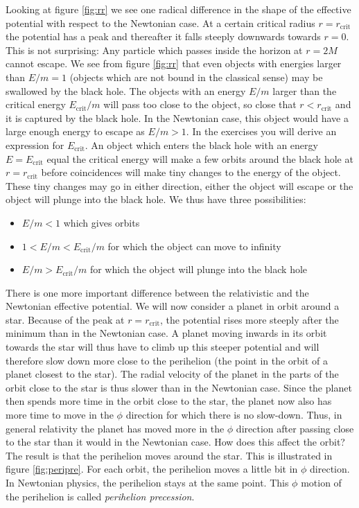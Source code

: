 \begin{multicols}{2}
Looking at figure \ref{fig:rr} we see one radical difference in the shape of the effective potential with respect to the Newtonian case. At a certain critical radius $r=r_\mathrm{crit}$ the potential has a peak and thereafter it falls steeply downwards towards $r=0$. This is not surprising: Any particle which passes inside the horizon at $r=2M$ cannot escape. We see from figure \ref{fig:rr} that even objects with energies larger than $E/m=1$ (objects which are not bound in the classical sense) may be swallowed by the black hole. The objects with an energy $E/m$ larger than the critical energy $E_\mathrm{crit}/m$ will pass too close to the object, so close that $r<r_\mathrm{crit}$ and it is captured by the black hole. In the Newtonian case, this object would have a large enough energy to escape as $E/m>1$. In the exercises you will derive an expression for $E_\mathrm{crit}$. An object which enters the black hole with an energy $E=E_\mathrm{crit}$ equal the critical energy will make a few orbits around the black hole at $r=r_\mathrm{crit}$ before coincidences will make tiny changes to the energy of the object. These tiny changes may go in either direction, either the object will escape or the object will plunge into the black hole. We thus have three possibilities:
\begin{itemize}
\item $E/m<1$ which gives orbits
\item $1<E/m<E_\mathrm{crit}/m$ for which the object can move to infinity
\item $E/m>E_\mathrm{crit}/m$ for which the object will plunge into the black hole
\end{itemize}

There is one more important difference between the relativistic and the Newtonian effective potential. We will now consider a planet in orbit around a star. Because of the peak at $r=r_\mathrm{crit}$, the potential rises more steeply after the minimum than in the Newtonian case. A planet moving inwards in its orbit towards the star will thus have to climb up this steeper potential and will therefore slow down more close to the perihelion (the point in the orbit of a planet closest to the star). The radial velocity of the planet in the parts of the orbit close to the star is thus slower than in the Newtonian case. Since the planet then spends more time in the orbit close to the star, the planet now also has more time to move in the $\phi$ direction for which there is no slow-down. Thus, in general relativity the planet has moved more in the $\phi$ direction after passing close to the star than it would in the Newtonian case. How does this affect the orbit? The result is that the perihelion moves around the star. This is illustrated in figure \ref{fig:peripre}. For each orbit, the perihelion moves a little bit in $\phi$ direction. In Newtonian physics, the perihelion stays at the same point. This $\phi$ motion of the perihelion is called {\it perihelion precession}.


\end{multicols}
